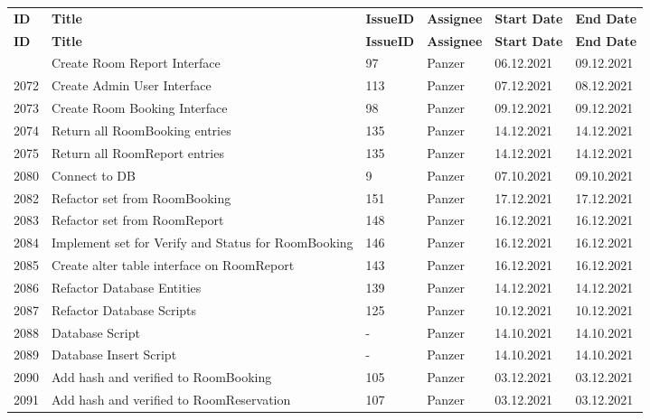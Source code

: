 \begin{longtable}{|p{}|p{}|p{}|p{}|p{}|p{}|} \hline
    \textbf{ID} & \textbf{Title} & \textbf{Issue\-ID} & \textbf{Assignee} & \textbf{Start Date} & \textbf{End\- Date} \\ \hhline{|=|=|=|=|=|=|}
    \endfirsthead
    \hline
    \textbf{ID} & \textbf{Title} & \textbf{Issue\-ID} & \textbf{Assignee} & \textbf{Start Date} & \textbf{End\- Date} \\ \hhline{|=|=|=|=|=|=|}
    \endhead
    2071 & Create Room Report Interface & 97 & Panzer & 06.12.2021 & 09.12.2021 \\ \hline
    2072 & Create Admin User Interface & 113 & Panzer & 07.12.2021 & 08.12.2021 \\ \hline
    2073 & Create Room Booking Interface & 98 & Panzer & 09.12.2021 & 09.12.2021 \\ \hline
    2074 & Return all RoomBooking entries & 135 & Panzer & 14.12.2021 & 14.12.2021 \\ \hline
    2075 & Return all RoomReport entries & 135 & Panzer & 14.12.2021 & 14.12.2021 \\ \hline
    2080 & Connect to DB & 9 & Panzer & 07.10.2021 & 09.10.2021 \\ \hline
    2082 & Refactor set from RoomBooking & 151 & Panzer & 17.12.2021 & 17.12.2021 \\ \hline
    2083 & Refactor set from RoomReport & 148 & Panzer & 16.12.2021 & 16.12.2021 \\ \hline
    2084 & Implement set for Verify and Status for RoomBooking & 146 & Panzer & 16.12.2021 & 16.12.2021 \\ \hline
    2085 & Create alter table interface on RoomReport & 143 & Panzer & 16.12.2021 & 16.12.2021 \\ \hline
    2086 & Refactor Database Entities & 139 & Panzer & 14.12.2021 & 14.12.2021 \\ \hline
    2087 & Refactor Database Scripts & 125 & Panzer & 10.12.2021 & 10.12.2021 \\ \hline
    2088 & Database Script & - & Panzer & 14.10.2021 & 14.10.2021 \\ \hline
    2089 & Database Insert Script & - & Panzer & 14.10.2021 & 14.10.2021 \\ \hline
    2090 & Add hash and verified to RoomBooking & 105 & Panzer & 03.12.2021 & 03.12.2021 \\ \hline
    2091 & Add hash and verified to RoomReservation & 107 & Panzer & 03.12.2021 & 03.12.2021 \\ \hline

\end{longtable}
